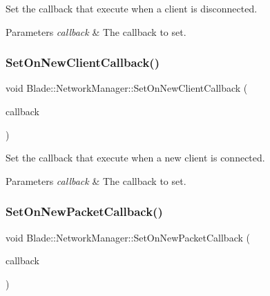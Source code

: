 Set the callback that execute when a client is disconnected. 


\begin{DoxyParams}{Parameters}
{\em callback} & The callback to set. \\
\hline
\end{DoxyParams}
\mbox{\label{class_blade_1_1_network_manager_a192f822f26e76829c2414f1505418a78}} 
\subsubsection{\texorpdfstring{Set\+On\+New\+Client\+Callback()}{SetOnNewClientCallback()}}
{\footnotesize\ttfamily void Blade\+::\+Network\+Manager\+::\+Set\+On\+New\+Client\+Callback (\begin{DoxyParamCaption}\item[{const On\+New\+Client\+Callback \&}]{callback }\end{DoxyParamCaption})\hspace{0.3cm}{\ttfamily [noexcept]}}



Set the callback that execute when a new client is connected. 


\begin{DoxyParams}{Parameters}
{\em callback} & The callback to set. \\
\hline
\end{DoxyParams}
\mbox{\label{class_blade_1_1_network_manager_a12f5afdfc075b71ea82d4d657a78d780}} 
\subsubsection{\texorpdfstring{Set\+On\+New\+Packet\+Callback()}{SetOnNewPacketCallback()}}
{\footnotesize\ttfamily void Blade\+::\+Network\+Manager\+::\+Set\+On\+New\+Packet\+Callback (\begin{DoxyParamCaption}\item[{const On\+New\+Packet\+Callback \&}]{callback }\end{DoxyParamCaption})\hspace{0.3cm}{\ttfamily [noexcept]}}



